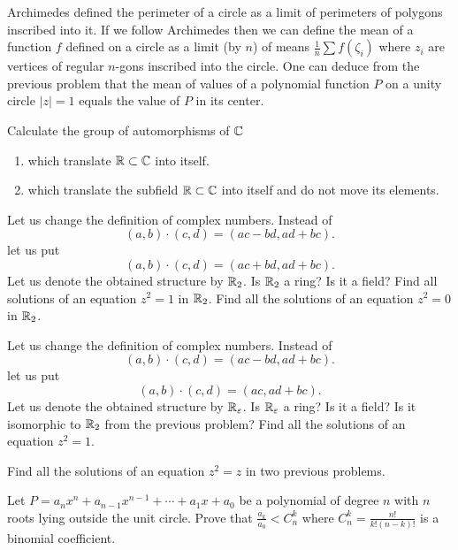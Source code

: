 \documentclass[12pt]{article}
\begin{document}
\begin{zamechanie} Archimedes defined the perimeter of a circle
  as a limit of perimeters of polygons inscribed into it. If we follow
  Archimedes then we can define the mean of a function $f$ defined on a
  circle as a limit (by $n$) of means $\frac 1 n \sum f(\zeta_i)$
  where $z_i$ are vertices of regular $n$-gons inscribed into the
  circle. One can deduce from the previous problem that the mean of
  values of a polynomial function $P$ on a unity circle $|z|=1$ equals
  the value of $P$ in its center.
\end{zamechanie}

\begin{zadacha}
Calculate the group of automorphisms of ${\mathbb C}$
\begin{enumerate}
\item\sttr which translate ${\mathbb R}\subset {\mathbb C}$ into itself.
\item which translate the subfield ${\mathbb R}\subset{\mathbb C}$ into itself and do
  not move its elements.
\end{enumerate}
\end{zadacha}

\begin{zadacha}[!]
Let us change the definition of complex numbers. Instead of
$$
(a, b) \cdot (c,d) = (ac - bd, ad + bc).
$$
let us put
$$
(a, b) \cdot (c,d) = (ac + bd, ad + bc).
$$
Let us denote the obtained structure by ${\mathbb R}_2$. Is ${\mathbb R}_2$ a ring? Is
it a field?  Find all solutions of an equation $z^2=1$ in ${\mathbb R}_2$.
Find all the solutions of an equation $z^2=0$ in ${\mathbb R}_2$.
\end{zadacha}

\begin{zadacha}[!]
Let us change the definition of complex numbers. Instead of
$$
(a, b) \cdot (c,d) = (ac - bd, ad + bc).
$$
let us put
$$
(a, b) \cdot (c,d) = (ac, ad + bc).
$$
Let us denote the obtained structure by ${\mathbb R}_\varepsilon$.  Is
${\mathbb R}_\varepsilon$ a ring? Is it a field? Is it isomorphic to ${\mathbb R}_2$ from
the previous problem?  Find all the solutions of an equation $z^2=1$.
\end{zadacha}

\begin{zadacha}[*]
Find all the solutions of an equation $z^2=z$ in two previous problems.
\end{zadacha}

\begin{zadacha}[*] 
  Let $P=a_n x^n + a_{n-1} x^{n-1} + \cdots + a_1 x + a_0$ be a
  polynomial of degree $n$ with $n$ roots lying outside the unit
  circle. Prove that $\frac {a_k}{a_0} < C_n^k$ where $C_n^k=
  \frac{n!}{k!(n-k)!}$ is a binomial coefficient.
\end{zadacha}
\end{document}
